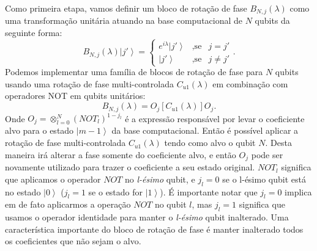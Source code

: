 Como primeira etapa, vamos definir um bloco de rotação de fase $B_{N,j}\left(\lambda\right)$ como uma  transformação unitária atuando na base computacional de $N$ qubits da seguinte forma:
\begin{equation}B_{N,j} \left( \lambda \right) \left| j' \right\rangle = \left\{ \begin{array}{ccc} e^{i\lambda} \left| j' \right\rangle & ,\text{se} & j=j' \\ \left| j' \right\rangle & , \text{se} & j\neq j' \end{array} \right. . \end{equation}
Podemos implementar uma família de blocos de  rotação de fase para $N$ qubits usando uma rotação de fase multi-controlada $C_{u1}\left(\lambda\right)$ em combinação com operadores NOT em qubits unitários:
\begin{equation}B_{N,j}\left(\lambda\right)=O_{j}\left[C_{u1}\left(\lambda\right)\right]O_{j}. \end{equation}
Onde $ O_{j}=\otimes_{l=0}^{N}\left(NOT_{l}\right)^{1-j_{l}}$  é a expressão responsável por levar o coeficiente alvo para o estado $\left|m-1\right\rangle $ da base computacional. Então é possível aplicar a rotação de fase multi-controlada $C_{u1}\left(\lambda\right)$  tendo como alvo o qubit $N$. Desta maneira irá alterar a fase somente do coeficiente alvo, e então $O_j$ pode ser novamente  utilizado  para trazer o coeficiente a seu estado original. $NOT_{l}$ significa que aplicamos o operador $NOT$ no \textit{l-ésimo} qubit, e $j_{l}=0$ se o l-ésimo qubit está no estado $\left|0\right\rangle $ ($j_{l}=1$ se o estado for $\left|1\right\rangle $). É importante notar que $j_{l}=0$ implica em de fato aplicarmos a operação $NOT$  no qubit $l$, mas $j_{l}=1$ significa que usamos o operador identidade para manter o \textit{l-ésimo} qubit inalterado. Uma característica importante  do bloco de rotação de fase é manter inalterado todos os coeficientes que não sejam o alvo. 

